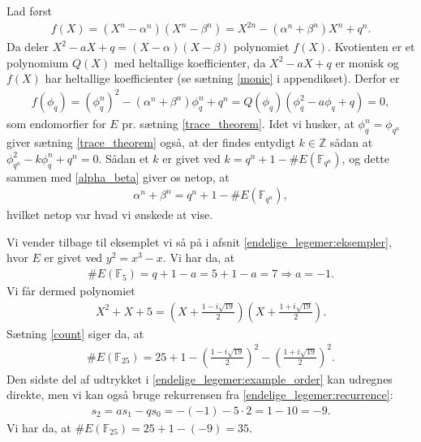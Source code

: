 \begin{proofof}
Lad først
\begin{align*}
	f(X) = (X^n - \alpha^n)(X^n - \beta^n) = X^{2n} - (\alpha^n + \beta^n)X^n + q^n.
\end{align*}
Da deler $X^2 - aX + q = (X- \alpha)(X-\beta)$ polynomiet $f(X)$. Kvotienten er et polynomium $Q(X)$ med heltallige koefficienter, da $X^2 - aX + q$ er monisk og $f(X)$ har heltallige koefficienter (se sætning \ref{monic} i appendikset). Derfor er
\begin{align}
	\label{alpha_beta}
	f(\phi_q) = (\phi_{q}^{n})^2 - (\alpha^n + \beta^n) \phi_{q}^{n} + q^n
	= Q(\phi_q)(\phi_{q}^{2} - a \phi_q + q) = 0,
\end{align}
som endomorfier for $E$ pr. sætning \ref{trace_theorem}. Idet vi husker, at $\phi_{q}^{n} = \phi_{q^n}$ giver sætning \ref{trace_theorem} også, at der findes entydigt $k \in \mathbb{Z}$ sådan at $\phi_{q^n}^{2} - k \phi_{q}^{n} + q^n = 0$. Sådan et $k$ er givet ved $k=q^n + 1 - \#E(\mathbb{F}_{q^n})$, og dette sammen med \eqref{alpha_beta} giver os netop, at
\begin{align*}
	\alpha^n + \beta^n = q^n + 1 - \#E(\mathbb{F}_{q^n}),
\end{align*}
hvilket netop var hvad  vi ønskede at vise.
\end{proofof}

\begin{example}
Vi vender tilbage til eksemplet vi så på i afsnit \ref{endelige_legemer:eksempler}, hvor $E$ er givet ved $y^2 = x^3 - x$. Vi har da, at 
\begin{align*}
	\#E(\mathbb{F}_5) = q + 1 - a = 5 + 1 - a = 7 \Rightarrow a = -1.
\end{align*}
Vi får dermed polynomiet
\begin{align*}
	X^2 + X + 5 = \left( X + \frac{1 - i \sqrt{19}}{2} \right) \left( X + \frac{1 + i \sqrt{19}}{2} \right).
\end{align*}
Sætning \ref{count} siger da, at
\begin{align}
\label{endelige_legemer:example_order}
	\#E(\mathbb{F}_{25}) = 25 + 1 - \left( \frac{1 - i \sqrt{19}}{2} \right)^2 - 
	\left(\frac{1 + i \sqrt{19}}{2} \right)^2.
\end{align}
Den sidste del af udtrykket i \eqref{endelige_legemer:example_order} kan udregnes direkte, men vi kan også bruge rekurrensen fra \ref{endelige_legemer:recurrence}:
\begin{align*}
	s_2 = as_1 - qs_0 = -(-1) - 5 \cdot 2 = 1 - 10 = -9.
\end{align*}
Vi har da, at $\#E(\mathbb{F}_{25}) = 25 + 1 - (-9) = 35$.

\end{example}




